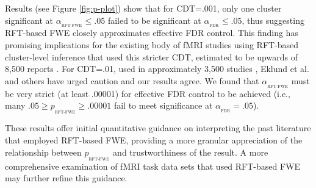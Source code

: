 \documentclass[9pt,twocolumn,twoside]{pnas-new}
\newcommand{\subtext}[2]{
#1_{_{\text{#2}}}
}
\begin{document}
Results (see Figure \ref{fig:p-plot}) show that for CDT=.001, only one cluster significant at $\subtext{\alpha}{RFT-FWE}\leq .05$ failed to be significant at $\subtext{\alpha}{FDR}\leq .05$, thus suggesting RFT-based FWE closely approximates effective FDR control.
This finding has promising implications for the existing body of fMRI studies using RFT-based cluster-level inference that used this stricter CDT, estimated to be upwards of 8,500 reports \cite{nichols_blog,woo14}.
For CDT=.01, used in approximately 3,500 studies \cite{nichols_blog,woo14}, Eklund et al. and others \cite{flandin_analysis_2016} have urged caution and our results agree. We found that $\subtext{\alpha}{RFT-FWE}$ must be very strict (at least .00001) for effective FDR control to be achieved (i.e., many $.05 \geq \subtext{p}{RFT-FWE} \geq .00001$ fail to meet significance at $\subtext{\alpha}{FDR}=.05$).


These results offer initial quantitative guidance on interpreting the past literature that employed RFT-based FWE, providing a more granular appreciation of the relationship between $\subtext{p}{RFT-FWE}$ and trustworthiness of the result.
A more comprehensive examination of fMRI task data sets that used RFT-based FWE may further refine this guidance. 




  
\end{document}
